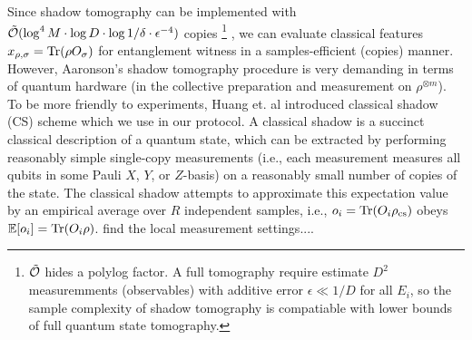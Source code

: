 \documentclass[
aps,
pra,
twocolumn,
floatfix,
]{revtex4-2}
\theoremstyle{plain}
\theoremstyle{definition}
\newtheorem{remark}{Remark}
\newcommand{\ob}{O}
\newcommand{\pob}{O}
\newcommand{\dm}{\rho}
\newcommand{\cs}{\text{cs}}
\begin{document}
Since shadow tomography can be implemented with $\tilde{\mathcal{O}}(\log^4 M\cdot \log D\cdot \log 1/\delta \cdot\epsilon^{-4})$ copies \footnote{$\tilde{\mathcal{O}}$ hides a polylog factor. A full tomography require estimate $D^2$ measuremments (observables) with additive error $\epsilon\ll 1/D$ for all $E_i$, so the sample complexity of shadow tomography is compatiable with lower bounds of full quantum state tomography.} \cite{aaronsonShadowTomographyQuantum2018},
we can evaluate classical features $x_{\dm,\sigma}=\Tr(\dm\pob_{\sigma})$ for entanglement witness in a samples-efficient (copies) manner.
However, Aaronson's shadow tomography procedure is very demanding in terms of quantum hardware (in the collective preparation and measurement on $\dm^{\otimes m}$).
To be more friendly to experiments, Huang et. al \cite{huangPredictingManyProperties2020} introduced classical shadow (CS) scheme which we use in our protocol.
A classical shadow is a succinct classical description of a quantum state, which can be extracted by performing reasonably simple single-copy measurements 
(i.e., each measurement measures all qubits in some Pauli $X$, $Y$, or $Z$-basis) 
on a reasonably small number of copies of the state.
The classical shadow attempts to approximate this expectation value by an empirical average over $R$ independent samples, 
i.e., $o_i = \Tr(O_i \dm_{\cs})$ obeys $\expectation[o_i] =\Tr(O_i \dm)$.
find the local measurement settings....
\end{document}
